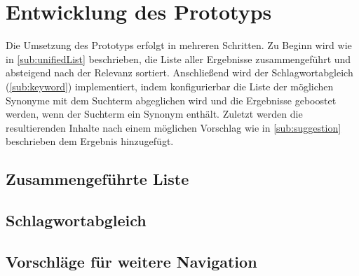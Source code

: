 \chapter{Entwicklung des Prototyps}
\label{ch:development}

Die Umsetzung des Prototyps erfolgt in mehreren Schritten. Zu Beginn wird wie in \ref{sub:unifiedList} beschrieben, die Liste aller Ergebnisse zusammengeführt und absteigend nach der Relevanz sortiert. Anschließend wird der Schlagwortabgleich (\ref{sub:keyword}) implementiert, indem konfigurierbar die Liste der möglichen Synonyme mit dem Suchterm abgeglichen wird und die Ergebnisse geboostet werden, wenn der Suchterm ein Synonym enthält. Zuletzt werden die resultierenden Inhalte nach einem möglichen Vorschlag wie in \ref{sub:suggestion} beschrieben dem Ergebnis hinzugefügt.

\section{Zusammengeführte Liste}
\label{sec:devUnifiedList}



\section{Schlagwortabgleich}
\label{sec:devKeywords}



\section{Vorschläge für weitere Navigation}
\label{sec:devSuggestions}


